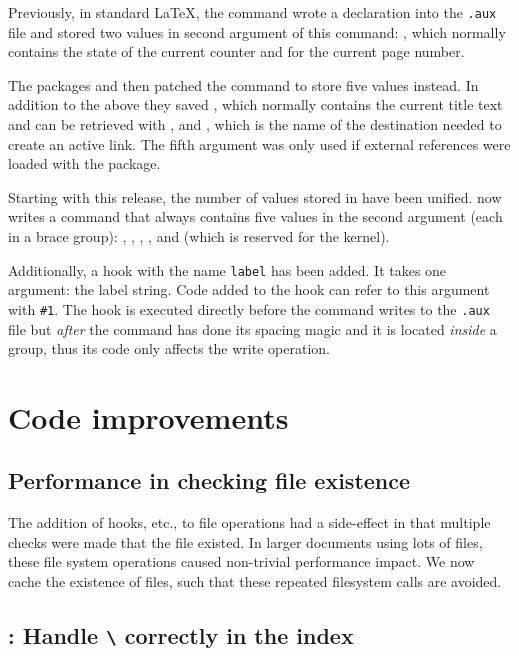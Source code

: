 \documentclass{ltnews}
\begin{document}
Previously, in standard \LaTeX{}, the  command wrote a  declaration into
the \texttt{.aux} file and stored two values in
second argument of this  command:
, which normally contains the state of the current 
counter and  for the current page number.

The packages  and 
 then patched the  command to store five values instead.
In addition to the above they saved , which normally contains the 
current title text and can be retrieved with , and 
, which is the name of the destination needed to create an 
active link. The fifth argument was only used if external 
references were loaded with the  package. 

Starting with this release, the number of values stored in  have been unified. 
 now writes a
 command that always contains five values in the second argument (each in a brace group):
, , , 
, and  (which is reserved for the kernel).

Additionally, a hook with the name \texttt{label} has been 
added. It takes one argument: the label string.
Code added to the hook can refer to this argument with \verb+#1+. 
The hook is executed directly before the  command writes to the \texttt{.aux} file
but \emph{after} the  command has done its spacing magic and it is located \emph{inside} a group, thus its code only affects the write operation. 

\section{Code improvements}

\subsection{Performance in checking file existence}

The addition of hooks, etc., to file operations had a side-effect in that
multiple checks were made that the file existed. In larger documents using
lots of files, these file system operations caused non-trivial performance
impact. We now cache the existence of files, such that these repeated filesystem
calls are avoided.

\subsection{: Handle \texttt{\textbackslash\textvisiblespace} correctly in the index}
\end{document}
